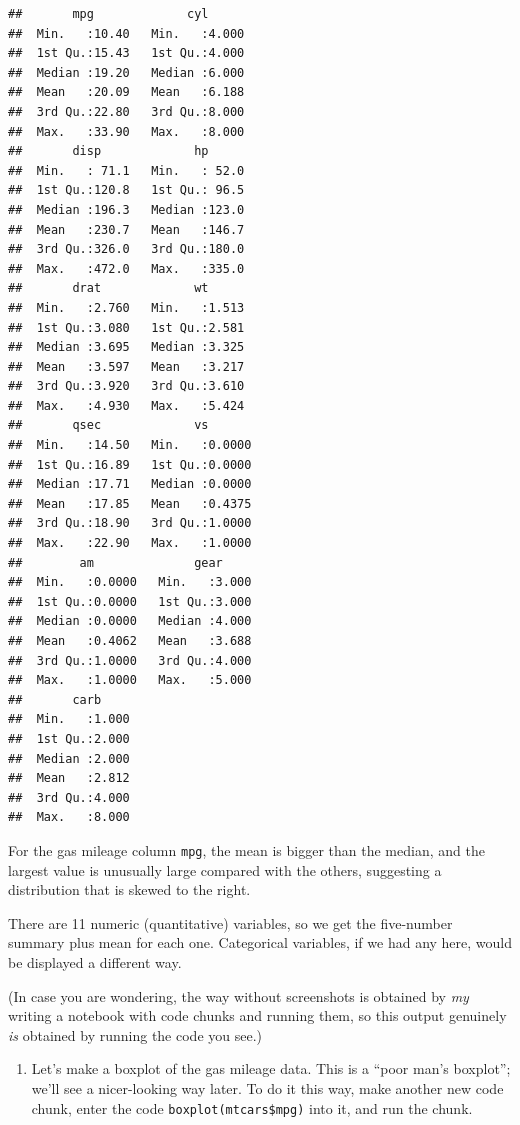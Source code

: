 \documentclass[]{tufte-book}
\providecommand{\tightlist}{%
  \setlength{\itemsep}{0pt}\setlength{\parskip}{0pt}}
\theoremstyle{definition}
\theoremstyle{definition}
\theoremstyle{definition}
\theoremstyle{remark}
\begin{document}
\begin{verbatim}
##       mpg             cyl       
##  Min.   :10.40   Min.   :4.000  
##  1st Qu.:15.43   1st Qu.:4.000  
##  Median :19.20   Median :6.000  
##  Mean   :20.09   Mean   :6.188  
##  3rd Qu.:22.80   3rd Qu.:8.000  
##  Max.   :33.90   Max.   :8.000  
##       disp             hp       
##  Min.   : 71.1   Min.   : 52.0  
##  1st Qu.:120.8   1st Qu.: 96.5  
##  Median :196.3   Median :123.0  
##  Mean   :230.7   Mean   :146.7  
##  3rd Qu.:326.0   3rd Qu.:180.0  
##  Max.   :472.0   Max.   :335.0  
##       drat             wt       
##  Min.   :2.760   Min.   :1.513  
##  1st Qu.:3.080   1st Qu.:2.581  
##  Median :3.695   Median :3.325  
##  Mean   :3.597   Mean   :3.217  
##  3rd Qu.:3.920   3rd Qu.:3.610  
##  Max.   :4.930   Max.   :5.424  
##       qsec             vs        
##  Min.   :14.50   Min.   :0.0000  
##  1st Qu.:16.89   1st Qu.:0.0000  
##  Median :17.71   Median :0.0000  
##  Mean   :17.85   Mean   :0.4375  
##  3rd Qu.:18.90   3rd Qu.:1.0000  
##  Max.   :22.90   Max.   :1.0000  
##        am              gear      
##  Min.   :0.0000   Min.   :3.000  
##  1st Qu.:0.0000   1st Qu.:3.000  
##  Median :0.0000   Median :4.000  
##  Mean   :0.4062   Mean   :3.688  
##  3rd Qu.:1.0000   3rd Qu.:4.000  
##  Max.   :1.0000   Max.   :5.000  
##       carb      
##  Min.   :1.000  
##  1st Qu.:2.000  
##  Median :2.000  
##  Mean   :2.812  
##  3rd Qu.:4.000  
##  Max.   :8.000
\end{verbatim}

For the gas mileage column \texttt{mpg}, the mean is bigger than the
median, and the largest value is unusually large compared with the
others, suggesting a distribution that is skewed to the right.

There are 11 numeric (quantitative) variables, so we get the five-number
summary plus mean for each one. Categorical variables, if we had any
here, would be displayed a different way.

(In case you are wondering, the way without screenshots is obtained by
\emph{my} writing a notebook with code chunks and running them, so this
output genuinely \emph{is} obtained by running the code you see.)

\begin{enumerate}
\def\labelenumi{(\alph{enumi})}
\setcounter{enumi}{6}
\tightlist
\item
  Let's make a boxplot of the gas mileage data. This is a ``poor man's
  boxplot''; we'll see a nicer-looking way later. To do it this way,
  make another new code chunk, enter the code
  \texttt{boxplot(mtcars\$mpg)} into it, and run the chunk.
\end{enumerate}
\end{document}

